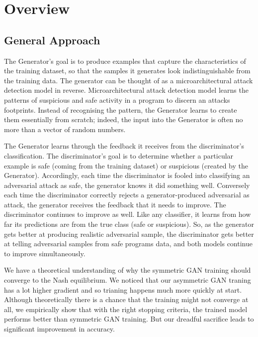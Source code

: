 \section{ Overview}\label{alg}
\subsection{General Approach}
 The Generator's goal is to produce examples that capture the characteristics of the training dataset,  so that the samples it generates look indistinguishable from the training data. The generator can be thought of as a microarchitectural attack detection model in reverse. Microarchitectural attack detection model learns the patterns of suspicious and safe activity in a program to discern an attacks footprints. Instead of recognising the pattern, the Generator learns to create them essentially from scratch; indeed, the input into the Generator is often no more than a vector of random numbers. %
 
 
 The Generator learns through the feedback it receives from the discriminator's classification. The discriminator's goal is to determine whether a particular example is safe (coming from the training dataset) or suspicious (created by the Generator). 
Accordingly, each time the discriminator is fooled into classifying an adversarial attack as safe, the generator knows it did something well. Conversely each time the discriminator correctly rejects a generator-produced adversarial as attack, the generator receives the feedback that it needs to improve.
The discriminator continues to improve as well. Like any classifier, it learns from how far its predictions are from the true class (safe or suspicious). So, as the generator gets better at producing realistic adversarial sample, the discriminator gets better at telling adversarial samples from safe programs data, and both models continue to improve simultaneously.

We have a theoretical understanding of why the symmetric GAN training should converge to the Nash equilibrium. We noticed that our asymmetric GAN traning has a lot higher gradient and so trianing happens much more quickly at start. Although theoretically there is a chance that the training might not converge at all, we empirically show that with the right stopping criteria, the trained model performs better than symmetric GAN training. 
But our dreadful sacrifice leads to significant improvement in accuracy.

